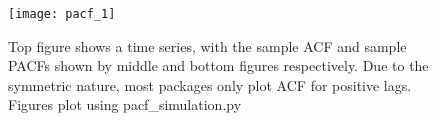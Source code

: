 \documentclass[../../time_series_notes.tex]{subfiles}
\begin{document}
\begin{figure}[h]
    \texttt{[image: pacf\_1]}
    \centering
    \caption {Top figure shows a time series, with the sample ACF and sample PACFs shown by middle and bottom figures respectively. Due to the symmetric nature, most packages only plot ACF for positive lags. Figures plot using pacf\_simulation.py}
    \label{fig:pacf_1} %
\end{figure}
\end{document}
